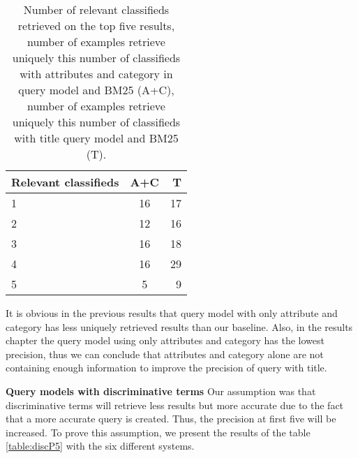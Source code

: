 \begin{table}[h]
\begin{center}
\caption{Number of relevant classifieds retrieved on the top five results, number of examples retrieve uniquely this number of classifieds with attributes and category in query model and BM25 (A+C), number of examples retrieve uniquely this number of classifieds with title query model and BM25 (T).}
\label{table:AcVsT}
\begin{tabular}{lcr}
\midrule
Relevant classifieds &  A+C & T \\
\midrule
	1 & 16 & 17 \\
	2 & 12  & 16 \\
	3 & 16 & 18 \\
	4 & 16 & 29 \\
	5 & 5 & 9 \\
\bottomrule
\end{tabular}
\end{center}
\end{table}



It is obvious in the previous results that query model with only attribute and category has less uniquely retrieved results than our baseline. Also, in the results chapter the query model using only attributes and category has the lowest precision, thus we can conclude that attributes and category alone are not containing enough information to improve the precision of query with title.


 \textbf{Query models with discriminative terms}
Our assumption was that discriminative terms will retrieve less results but more accurate due to the fact that a more accurate query is created. Thus, the precision at first five will be increased. To prove this assumption, we present the results of the table \ref{table:discP5} with the six different systems.


